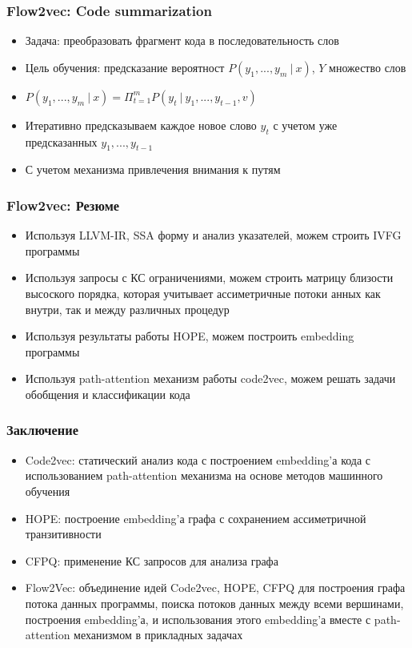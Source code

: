 \documentclass[xcolor=table,english]{beamer}
\begin{document}
\begin{frame}[fragile] \frametitle{Flow2vec: Code summarization}
    \begin{itemize}
        \item Задача: преобразовать фрагмент кода в последовательность слов 
        \item Цель обучения: предсказание вероятност $P(y_1, ..., y_m~|~x)$, $Y$ множество слов
        \item $P(y_1, ..., y_m~|~x) = \Pi_{t=1}^m P(y_t~|~y_1, ..., y_{t-1}, v)$
        \item Итеративно предсказываем каждое новое слово $y_t$ с учетом уже предсказанных $y_1, ..., y_{t-1}$
        \item С учетом механизма привлечения внимания к путям
    \end{itemize}
\end{frame}

\begin{frame}[fragile] \frametitle{Flow2vec: Резюме}
    \begin{itemize}
        \item Используя LLVM-IR, SSA форму и анализ указателей, можем строить IVFG программы
        \item Используя запросы с КС ограничениями, можем строить матрицу близости высоского порядка, которая учитывает ассиметричные потоки анных как внутри, так и между различных процедур
        \item Используя результаты работы HOPE, можем построить embedding программы
        \item Используя path-attention механизм работы code2vec, можем решать задачи обобщения и классификации кода
    \end{itemize}
\end{frame}

\begin{frame}[fragile] \frametitle{Заключение}
    \begin{itemize}
        \item Code2vec: статический анализ кода с построением embedding'а кода с использованием path-attention механизма на основе методов машинного обучения
        \item HOPE: построение embedding'а графа с сохранением ассиметричной транзитивности
        \item CFPQ: применение КС запросов для анализа графа
        \item Flow2Vec: объединение идей Code2vec, HOPE, CFPQ для построения графа потока данных программы, поиска потоков данных между всеми вершинами, построения embedding'а, и использования этого embedding'а вместе с path-attention механизмом в прикладных задачах 
    \end{itemize}
\end{frame}
\end{document}
